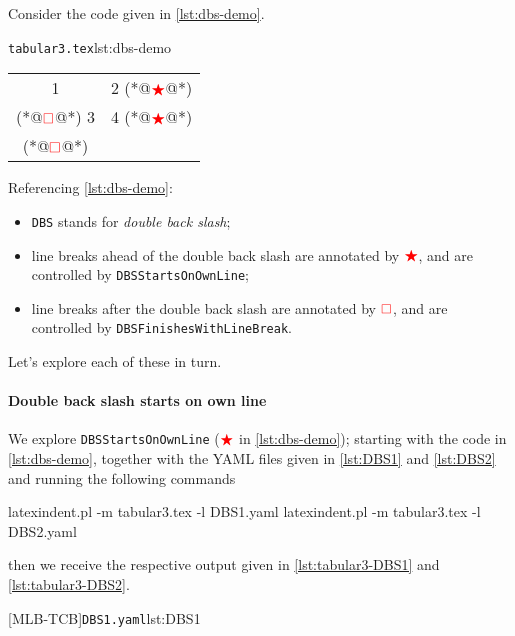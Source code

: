 	Consider the code given in \cref{lst:dbs-demo}.
	\begin{cmhlistings}[style=tcblatex,escapeinside={(*@}{@*)}]{\texttt{tabular3.tex}}{lst:dbs-demo}
\begin{tabular}{cc}
 1 & 2 (*@$\color{red}\bigstar$@*)\\(*@$\color{red}\square$@*) 3 & 4 (*@$\color{red}\bigstar$@*)\\(*@$\color{red}\square$@*)
\end{tabular}
\end{cmhlistings}
	Referencing \cref{lst:dbs-demo}:
	\begin{itemize}
		\item \texttt{DBS} stands for \emph{double back slash};
		\item line breaks ahead of the double back slash are annotated by $\color{red}\bigstar$, and
		      are controlled by \texttt{DBSStartsOnOwnLine};
		\item line breaks after the double back slash are annotated by $\color{red}\square$,
		      and are controlled by \texttt{DBSFinishesWithLineBreak}.
	\end{itemize}

	Let's explore each of these in turn.

	\paragraph{Double back slash starts on own line}
		We explore \texttt{DBSStartsOnOwnLine} ($\color{red}\bigstar$ in \cref{lst:dbs-demo});
		starting with the code in \cref{lst:dbs-demo}, together with the YAML files given in
		\cref{lst:DBS1} and \cref{lst:DBS2} and running the following commands
		\begin{commandshell}
latexindent.pl -m tabular3.tex -l DBS1.yaml
latexindent.pl -m tabular3.tex -l DBS2.yaml
\end{commandshell}
		then we receive the respective output given in \cref{lst:tabular3-DBS1} and
		\cref{lst:tabular3-DBS2}.

		\begin{cmhtcbraster}[raster column skip=.01\linewidth]
			{\texttt{DBS1.yaml}}{lst:DBS1}
		\end{cmhtcbraster}

